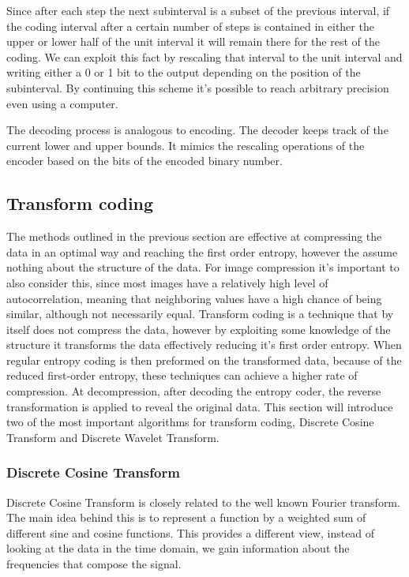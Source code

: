       Since after each step the next subinterval is a subset of the previous interval, if the coding interval after a certain number of steps is contained in either the upper or lower half of the unit interval it will remain there for the rest of the coding. We can exploit this fact by rescaling that interval to the unit interval and writing either a 0 or 1 bit to the output depending on the position of the subinterval. By continuing this scheme it's possible to reach arbitrary precision even using a computer.

      The decoding process is analogous to encoding. The decoder keeps track of the current lower and upper bounds. It mimics the rescaling operations of the encoder based on the bits of the encoded binary number.

  \subsection{Transform coding}
    The methods outlined in the previous section are effective at compressing the data in an optimal way and reaching the first order entropy, however the assume nothing about the structure of the data. For image compression it's important to also consider this, since most images have a relatively high level of autocorrelation, meaning that neighboring values have a high chance of being similar, although not necessarily equal. Transform coding is a technique that by itself does not compress the data, however by exploiting some knowledge of the structure it transforms the data effectively reducing it's first order entropy. When regular entropy coding is then preformed on the transformed data, because of the reduced first-order entropy, these techniques can achieve a higher rate of compression. At decompression, after decoding the entropy coder, the reverse transformation is applied to reveal the original data. This section will introduce two of the most important algorithms for transform coding, Discrete Cosine Transform and Discrete Wavelet Transform.

    \subsubsection{Discrete Cosine Transform}
      Discrete Cosine Transform \cite{ahmed_discrete_1974} is closely related to the well known Fourier transform. The main idea behind this is to represent a function by a weighted sum of different sine and cosine functions. This provides a different view, instead of looking at the data in the time domain, we gain information about the frequencies that compose the signal. 

